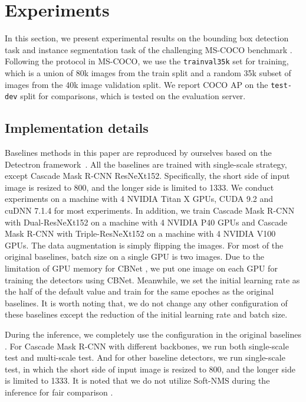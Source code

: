 \documentclass[letterpaper]{article} \usepackage{aaai20}  \usepackage{multirow}
\begin{document}
\section{Experiments}
\label{section 4}
In this section, we present experimental results on the bounding box detection task and instance segmentation task of the challenging MS-COCO benchmark \cite{lin2014microsoft}. Following the protocol in MS-COCO, we use the \texttt{trainval35k} set for training, which is a union of 80k images from the train split and a random 35k subset of images from the 40k image validation split. We report COCO AP on the \texttt{test-dev} split for comparisons, which is tested on the evaluation server.



\subsection{Implementation details}

Baselines methods in this paper are reproduced by ourselves based on the Detectron framework~\cite{Detectron2018}. All the baselines are trained with single-scale strategy, except Cascade Mask R-CNN ResNeXt152. Specifically, the short side of input image is resized to 800, and the longer side is limited to 1333. We conduct experiments on a machine with 4 NVIDIA Titan X GPUs, CUDA 9.2 and cuDNN 7.1.4 for most experiments. In addition, we train Cascade Mask R-CNN with Dual-ResNeXt152 on a machine with 4 NVIDIA P40 GPUs and Cascade Mask R-CNN with Triple-ResNeXt152 on a machine with 4 NVIDIA V100 GPUs. The data augmentation is simply flipping the images. For most of the original baselines, batch size on a single GPU is two images. Due to the limitation of GPU memory for CBNet , we put one image on each GPU for training the detectors using CBNet. Meanwhile, we set the initial learning rate as the half of the default value and train for the same epoches as the original baselines. It is worth noting that, we do not change any other configuration of these baselines except the reduction of the initial learning rate and batch size.

During the inference, we completely use the configuration in the original baselines \cite{Detectron2018}. For Cascade Mask R-CNN with different backbones, we run both single-scale test and multi-scale test. And for other baseline detectors, we run single-scale test, in which the short side of input image is resized to 800, and the longer side is limited to 1333. It is noted that we do not utilize Soft-NMS \cite{bodla2017soft} during the inference for fair comparison .
\end{document}
